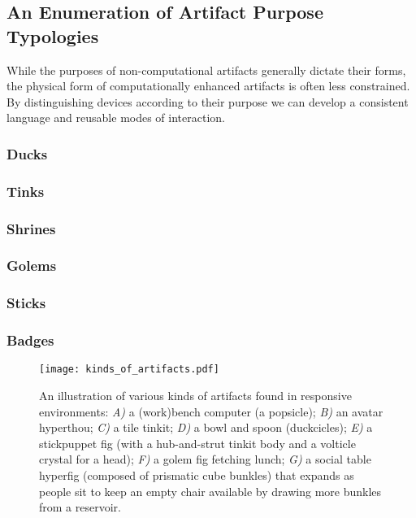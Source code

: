 \subsection{An Enumeration of Artifact Purpose Typologies} %
%
While the purposes of non-computational artifacts generally dictate their forms, the physical form of computationally enhanced artifacts is often less constrained. By distinguishing devices according to their purpose we can develop a consistent language and reusable modes of interaction.

\subsubsection{Ducks}


\subsubsection{Tinks}

\subsubsection{Shrines}

\subsubsection{Golems}

\subsubsection{Sticks}

\subsubsection{Badges}

%
\begin{figure}[h!]
  \centering
    \texttt{[image: kinds\_of\_artifacts.pdf]}
  \caption{An illustration of various kinds of artifacts found in responsive environments: \emph{A)} a (work)bench computer (a popsicle); \emph{B)} an avatar hyperthou; \emph{C)} a tile tinkit; \emph{D)} a bowl and spoon (duckcicles); \emph{E)} a stickpuppet fig (with a hub-and-strut tinkit body and a volticle crystal for a head); \emph{F)} a golem fig fetching lunch; \emph{G)} a social table hyperfig (composed of prismatic cube bunkles) that expands as people sit to keep an empty chair available by drawing more bunkles from a reservoir.}
  \label{fig:kinds_of_artifacts}
\end{figure}
%


